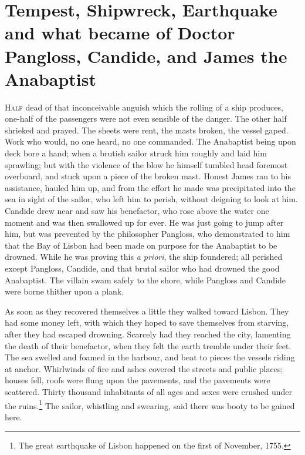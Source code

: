 \vspace{1cm}
\begingroup
\let\clearpage\relax
\chapter{Tempest, Shipwreck, Earthquake and what became of Doctor Pangloss, Candide, and James the Anabaptist}
\endgroup
\vspace{-1cm}
\lettrine[lraise=0.1,nindent=0em,slope=-.5em]{H}{alf} dead of that inconceivable anguish which the rolling of a ship produces, one-half of the passengers were not even sensible of the danger. The other half shrieked and prayed. The sheets were rent, the masts broken, the vessel gaped. Work who would, no one heard, no one commanded. The Anabaptist being upon deck bore a hand; when a brutish sailor struck him roughly and laid him sprawling; but with the violence of the blow he himself tumbled head foremost overboard, and stuck upon a piece of the broken mast. Honest James ran to his assistance, hauled him up, and from the effort he made was precipitated into the sea in sight of the sailor, who left him to perish, without deigning to look at him. Candide drew near and saw his benefactor, who rose above the water one moment and was then swallowed up for ever. He was just going to jump after him, but was prevented by the philosopher Pangloss, who demonstrated to him that the Bay of Lisbon had been made on purpose for the Anabaptist to be drowned. While he was proving this \textit{a priori}, the ship foundered; all perished except Pangloss, Candide, and that brutal sailor who had drowned the good Anabaptist. The villain swam safely to the shore, while Pangloss and Candide were borne thither upon a plank.

As soon as they recovered themselves a little they walked toward Lisbon. They had some money left, with which they hoped to save themselves from starving, after they had escaped drowning. Scarcely had they reached the city, lamenting the death of their benefactor, when they felt the earth tremble under their feet. The sea swelled and foamed in the harbour, and beat to pieces the vessels riding at anchor. Whirlwinds of fire and ashes covered the streets and public places; houses fell, roofs were flung upon the pavements, and the pavements were scattered. Thirty thousand inhabitants of all ages and sexes were crushed under the ruins.\footnote{The great earthquake of Lisbon happened on the first of November, 1755.} The sailor, whistling and swearing, said there was booty to be gained here.

